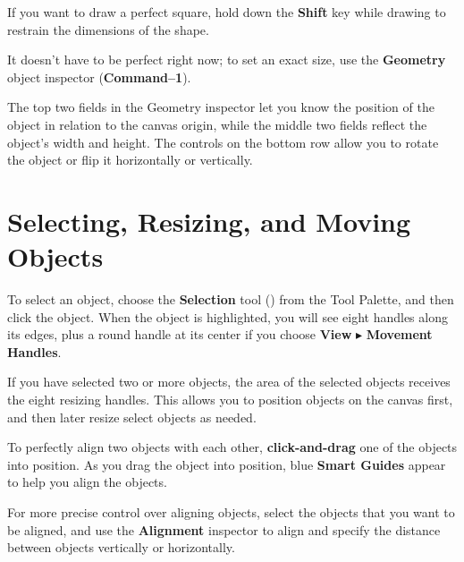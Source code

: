 \documentclass[../main.tex]{subfiles}
\begin{document}

\begin{ogtip}
  If you want to draw a perfect square, hold down the \textbf{Shift} key while drawing to restrain
  the dimensions of the shape.
\end{ogtip}

It doesn't have to be perfect right now; to set an exact size, use the \textbf{Geometry} object
inspector (\textbf{Command--1}).


The top two fields in the Geometry inspector let you know the position of the object in relation
to the canvas origin, while the middle two fields reflect the object's width and height. The
controls on the bottom row allow you to rotate the object or flip it horizontally or
vertically.

\section{Selecting, Resizing, and Moving Objects}

To select an object, choose the \textbf{Selection} tool
() from the Tool Palette, and then click the
object. When the object is highlighted, you will see eight handles along its edges, plus a
round handle at its center if you choose \textbf{View} $\blacktriangleright$ \textbf{Movement
Handles}.


If you have selected two or more objects, the area of the selected objects receives the eight
resizing handles. This allows you to position objects on the canvas first, and then later
resize select objects as needed.


To perfectly align two objects with each other, \textbf{click-and-drag} one of the objects into
position. As you drag the object into position, blue \textbf{Smart Guides} appear to help you
align the objects.


For more precise control over aligning objects, select the objects that you want to be aligned,
and use the \textbf{Alignment} inspector to align and specify the distance between objects
vertically or horizontally.
\end{document}
